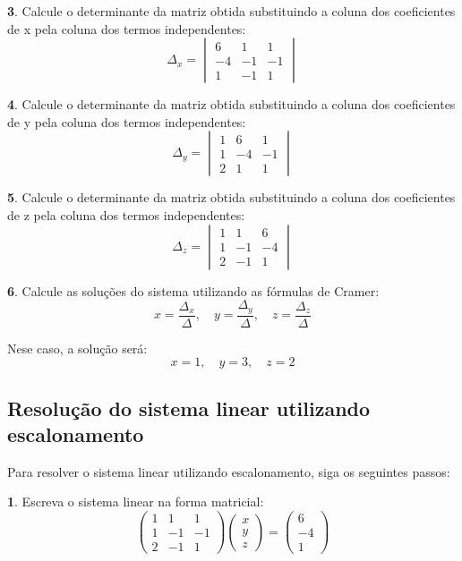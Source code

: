 \documentclass[12pt]{article}
\begin{document}
\textbf{3}. Calcule o determinante da matriz obtida substituindo a coluna dos coeficientes de x pela coluna dos termos independentes:
\[
\Delta_x = \begin{vmatrix}
    6  &  1  &  1 \\
   -4  & -1  & -1 \\
    1  & -1  &  1
\end{vmatrix}
\]

\textbf{4}. Calcule o determinante da matriz obtida substituindo a coluna dos coeficientes de y pela coluna dos termos independentes:
\[
\Delta_y = \begin{vmatrix}
    1  &  6  &  1 \\
    1  & -4  & -1 \\
    2  &  1  &  1
\end{vmatrix}
\]

\textbf{5}. Calcule o determinante da matriz obtida substituindo a coluna dos coeficientes de z pela coluna dos termos independentes:
\[
\Delta_z = \begin{vmatrix}
    1  &  1  &  6 \\
    1  & -1  & -4 \\
    2  & -1  &  1
\end{vmatrix}
\]

\textbf{6}. Calcule as soluções do sistema utilizando as fórmulas de Cramer:
\[
x = \frac{\Delta_x}{\Delta}, \quad y = \frac{\Delta_y}{\Delta}, \quad z = \frac{\Delta_z}{\Delta}
\]

Nese caso, a solução será:
\[
x = 1, \quad y = 3, \quad z = 2
\]

\subsection{Resolução do sistema linear utilizando escalonamento}
Para resolver o sistema linear utilizando escalonamento, siga os seguintes passos:

\textbf{1}. Escreva o sistema linear na forma matricial:
\[
\begin{pmatrix}
    1  &  1  &  1 \\
    1  & -1  & -1 \\
    2  & -1  &  1
\end{pmatrix}
\begin{pmatrix}
x \\
y \\
z
\end{pmatrix}
=
\begin{pmatrix}
 6 \\
-4 \\
 1
\end{pmatrix}
\]
\end{document}
